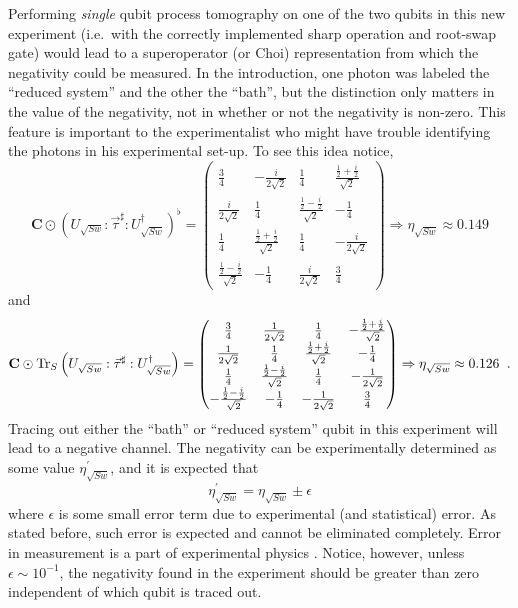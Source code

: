 Performing {\em single} qubit process tomography on one of the two qubits in this new experiment (i.e.\ with the correctly implemented sharp operation and root-swap gate) would lead to a superoperator (or Choi) representation from which the negativity could be measured.  In the introduction, one photon was labeled the ``reduced system'' and the other the ``bath'', but the distinction only matters in the value of the negativity, not in whether or not the negativity is non-zero.  This feature is important to the experimentalist who might have trouble identifying the photons in his experimental set-up.  To see this idea notice,
$$
\mathbf{C}\odot\left(U_{\sqrt{Sw}}:\vec{\tau}^\sharp:U_{\sqrt{Sw}}^\dagger\right)^\flat =
\begin{pmatrix}
 \frac{3}{4} & -\frac{i}{2 \sqrt{2}} & \frac{1}{4} & \frac{\frac{1}{2}+\frac{i}{2}}{\sqrt{2}} \\
 \frac{i}{2 \sqrt{2}} & \frac{1}{4} & \frac{\frac{1}{2}-\frac{i}{2}}{\sqrt{2}} & -\frac{1}{4} \\
 \frac{1}{4} & \frac{\frac{1}{2}+\frac{i}{2}}{\sqrt{2}} & \frac{1}{4} & -\frac{i}{2 \sqrt{2}} \\
 \frac{\frac{1}{2}-\frac{i}{2}}{\sqrt{2}} & -\frac{1}{4} & \frac{i}{2 \sqrt{2}} & \frac{3}{4}
\end{pmatrix}\Rightarrow \eta_{\sqrt{Sw}} \approx 0.149
$$
and
$$
\mathbf{C}\odot\operatorname{Tr}_S\left(U_{\sqrt{Sw}}:\vec{\tau}^\sharp:U_{\sqrt{Sw}}^\dagger\right) =
\begin{pmatrix}
 \frac{3}{4} & \frac{1}{2 \sqrt{2}} & \frac{1}{4} & -\frac{\frac{1}{2}+\frac{i}{2}}{\sqrt{2}} \\
 \frac{1}{2 \sqrt{2}} & \frac{1}{4} & \frac{\frac{1}{2}+\frac{i}{2}}{\sqrt{2}} & -\frac{1}{4} \\
 \frac{1}{4} & \frac{\frac{1}{2}-\frac{i}{2}}{\sqrt{2}} & \frac{1}{4} & -\frac{1}{2 \sqrt{2}} \\
 -\frac{\frac{1}{2}-\frac{i}{2}}{\sqrt{2}} & -\frac{1}{4} & -\frac{1}{2 \sqrt{2}} & \frac{3}{4}
\end{pmatrix}\Rightarrow \eta_{\sqrt{Sw}} \approx 0.126\;\;.
$$
Tracing out either the ``bath'' or ``reduced system'' qubit in this experiment will lead to a negative channel.  The negativity can be experimentally determined as some value $\eta_{\sqrt{Sw}}^\prime$, and it is expected that
$$
\eta_{\sqrt{Sw}}^\prime = \eta_{\sqrt{Sw}} \pm \epsilon
$$
where $\epsilon$ is some small error term due to experimental (and statistical) error.  As stated before, such error is expected and cannot be eliminated completely.  Error in measurement is a part of experimental physics \cite{Taylor1997}.  Notice, however, unless $\epsilon\sim 10^{-1}$, the negativity found in the experiment should be greater than zero independent of which qubit is traced out.  

